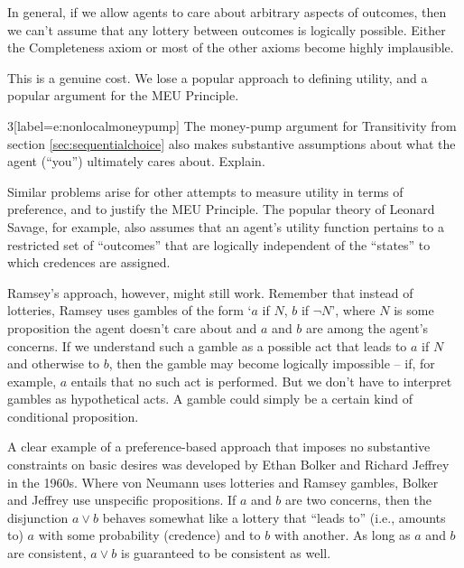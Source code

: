 In general, if we allow agents to care about arbitrary aspects of outcomes, then
we can't assume that any lottery between outcomes is logically possible. Either
the Completeness axiom or most of the other axioms become highly implausible.

This is a genuine cost. We lose a popular approach to defining utility, and a
popular argument for the MEU Principle.

\begin{exercise}{3}[label=e:nonlocalmoneypump]
  The money-pump argument for Transitivity from section
  \ref{sec:sequentialchoice} also makes substantive assumptions about what the
  agent (``you'') ultimately cares about. Explain.
\end{exercise}

Similar problems arise for other attempts to measure utility in terms of
preference, and to justify the MEU Principle. The popular theory of Leonard
Savage, for example, also assumes that an agent's utility function pertains to a
restricted set of ``outcomes'' that are logically independent of the ``states''
to which credences are assigned.


Ramsey's approach, however, might still work. Remember that instead of
lotteries, Ramsey uses gambles of the form `$a$ if $N$, $b$ if $\neg N$', where
$N$ is some proposition the agent doesn't care about and $a$ and $b$ are among
the agent's concerns. If we understand such a gamble as a possible act that
leads to $a$ if $N$ and otherwise to $b$, then the gamble may become logically
impossible -- if, for example, $a$ entails that no such act is performed. But we
don't have to interpret gambles as hypothetical acts. A gamble could simply be a
certain kind of conditional proposition.

A clear example of a preference-based approach that imposes no substantive
constraints on basic desires was developed by Ethan Bolker and Richard Jeffrey
in the 1960s. Where von Neumann uses lotteries and Ramsey gambles, Bolker and
Jeffrey use unspecific propositions. If $a$ and $b$ are two concerns, then the
disjunction $a \lor b$ behaves somewhat like a lottery that ``leads to'' (i.e.,
amounts to) $a$ with some probability (credence) and to $b$ with another. As
long as $a$ and $b$ are consistent, $a \lor b$ is guaranteed to be consistent as
well.

